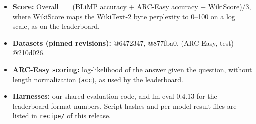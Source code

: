 \begin{itemize}
  \item \textbf{Score:} Overall $=$ (BLiMP accuracy $+$ ARC-Easy accuracy $+$ WikiScore)$/3$, where WikiScore maps the
  WikiText-2 byte perplexity to 0--100 on a log scale, as on the leaderboard.
  \item \textbf{Datasets (pinned revisions):}  @6472347,
   @877fba0,  (ARC-Easy, test) @210d026.
  \item \textbf{ARC-Easy scoring:} log-likelihood of the answer given the question, without length normalization
  (\texttt{acc}), as used by the leaderboard.
  \item \textbf{Harnesses:} our shared evaluation code, and lm-eval 0.4.13 for the leaderboard-format numbers. Script
  hashes and per-model result files are listed in \texttt{recipe/} of this release.
\end{itemize}
